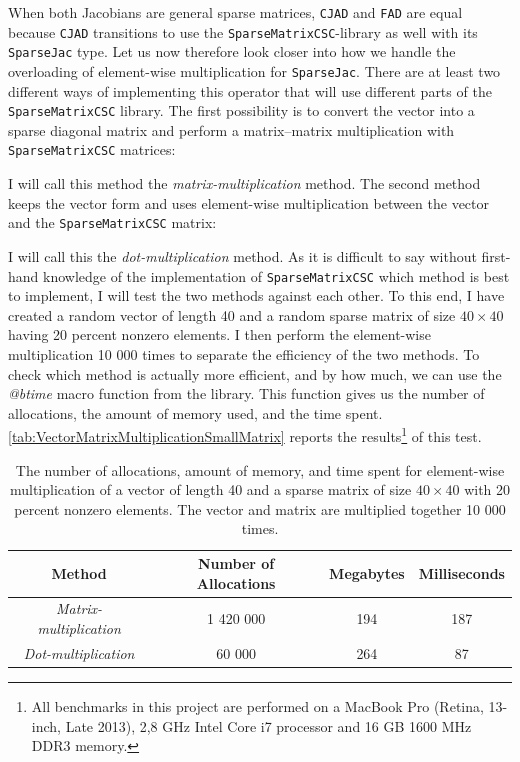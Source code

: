 When both Jacobians are general sparse matrices, \texttt{CJAD} and \texttt{FAD} are equal because \texttt{CJAD} transitions to use the \texttt{SparseMatrixCSC}-library as well with its \texttt{SparseJac} type. Let us now therefore look closer into how we handle the overloading of element-wise multiplication for \texttt{SparseJac}.  There are at least two different ways of implementing this operator that will use different parts of the \texttt{SparseMatrixCSC} library. The first possibility is to convert the vector into a sparse diagonal matrix and perform a matrix--matrix multiplication with \texttt{SparseMatrixCSC} matrices:

I will call this method the \textit{matrix-multiplication} method. The second method keeps the vector form and uses element-wise multiplication between the vector and the \texttt{SparseMatrixCSC} matrix:

I will call this the \textit{dot-multiplication} method. As it is difficult to say without first-hand knowledge of the implementation of \texttt{SparseMatrixCSC} which method is best to implement, I will test the two methods against each other. 
To this end, I have created a random vector of length 40 and a random sparse matrix of size $40\times 40$ having 20 percent nonzero elements. I then perform the element-wise multiplication 10 000 times to separate the efficiency of the two methods. To check which method is actually more efficient, and by how much, we can use the \textit{@btime} macro function from the \emph{\cite{BenchmarkTools}} library. This function gives us the number of allocations, the amount of memory used, and the time spent.
\autoref{tab:VectorMatrixMultiplicationSmallMatrix} reports the results\footnote{All benchmarks in this project are performed on a MacBook Pro (Retina, 13-inch, Late 2013), 2,8 GHz Intel Core i7 processor and 16 GB 1600 MHz DDR3 memory.} of this test.
\begin{table}[H]
    \centering
    \caption{The number of allocations, amount of memory, and time spent for element-wise multiplication of a vector of length 40 and a sparse matrix of size $40\times 40$ with 20 percent nonzero elements. The vector and matrix are multiplied together 10 000 times.}
    \label{tab:VectorMatrixMultiplicationSmallMatrix}
    \def\arraystretch{1.5}
    \begin{tabular}{cccc}
    \textbf{Method} & \textbf{Number of Allocations} & \textbf{Megabytes} & \textbf{Milliseconds} \\
        \hline
         \textit{Matrix-multiplication} & 1 420 000 & 194 & 187 \\  
         \textit{Dot-multiplication} & 60 000 & 264 & 87\\ 
         \hline
    \end{tabular}
\end{table}
